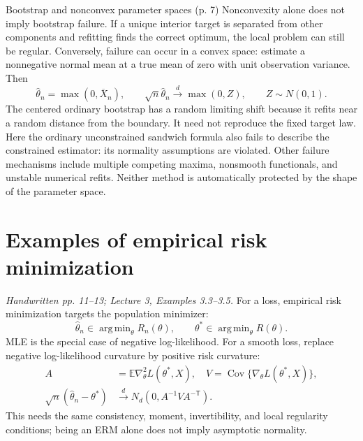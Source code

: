 \documentclass[12pt]{article}
\newcommand{\E}{\mathbb E}
\DeclareMathOperator*{\argmin}{arg\,min}
\begin{document}
\begin{todobox}{Bootstrap and nonconvex parameter spaces (p. 7)}
Nonconvexity alone does not imply bootstrap failure. If a unique interior
target is separated from other components and refitting finds the correct
optimum, the local problem can still be regular. Conversely, failure can
occur in a convex space: estimate a nonnegative normal mean at a true mean
of zero with unit observation variance. Then
\begin{equation}
 \widehat\theta_n=\max(0,\overline X_n),\qquad
 \sqrt n\widehat\theta_n\xrightarrow{d}\max(0,Z),\qquad Z\sim N(0,1).
\end{equation}
The centered ordinary bootstrap has a random limiting shift because it
refits near a random distance from the boundary. It need not reproduce the
fixed target law. Here the ordinary unconstrained sandwich formula also
fails to describe the constrained estimator: its normality assumptions
are violated. Other failure mechanisms include multiple competing maxima,
nonsmooth functionals, and unstable numerical refits. Neither method is
automatically protected by the shape of the parameter space.
\end{todobox}

\section{Examples of empirical risk minimization}
\textit{Handwritten pp. 11--13; Lecture 3, Examples 3.3--3.5.}
For a loss, empirical risk minimization targets the population minimizer:
\begin{equation}
 \widehat\theta_n\in\argmin_\theta R_n(\theta),\qquad
 \theta^*\in\argmin_\theta R(\theta).
\end{equation}
MLE is the special case of negative log-likelihood. For a smooth loss,
replace negative log-likelihood curvature by positive risk curvature:
\begin{align}
 A&=\E\nabla_\theta^2 L(\theta^*,X),\quad
 V=\operatorname{Cov}\{\nabla_\theta L(\theta^*,X)\},\\
 \sqrt n(\widehat\theta_n-\theta^*)&\xrightarrow{d}
 N_d(0,A^{-1}VA^{-\mathsf T}).
\end{align}
This needs the same consistency, moment, invertibility, and local regularity
conditions; being an ERM alone does not imply asymptotic normality.
\end{document}
